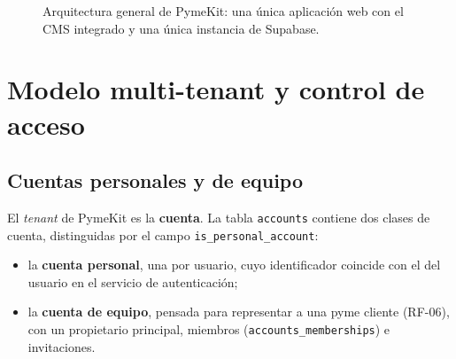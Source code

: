 \begin{figure}[htbp]
  \caption{Arquitectura general de PymeKit: una única aplicación web con el
    CMS integrado y una única instancia de Supabase.}
  \label{fig:arquitectura}
\end{figure}

\section{Modelo multi-tenant y control de acceso}
\label{sec:multitenant-rbac}

\subsection{Cuentas personales y de equipo}

El \textit{tenant} de PymeKit es la \textbf{cuenta}. La tabla
\texttt{accounts} contiene dos clases de cuenta, distinguidas por el campo
\texttt{is\_personal\_account}:

\begin{itemize}
  \item la \textbf{cuenta personal}, una por usuario, cuyo identificador
        coincide con el del usuario en el servicio de autenticación;
  \item la \textbf{cuenta de equipo}, pensada para representar a una pyme
        cliente (RF-06), con un propietario principal, miembros
        (\texttt{accounts\_memberships}) e invitaciones.
\end{itemize}

